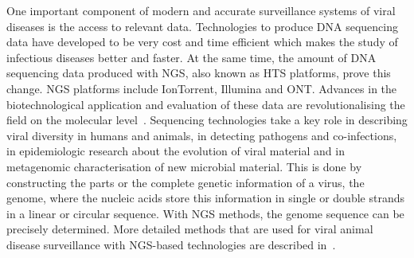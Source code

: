 One important component of modern and accurate surveillance systems of viral diseases is the access to relevant data. Technologies to produce \ac{DNA} sequencing data have developed to be very cost and time efficient which makes the study of infectious diseases better and faster. At the same time, the amount of \ac{DNA} sequencing data produced with \ac{NGS}, also known as \ac{HTS} platforms, prove this change. \ac{NGS} platforms include IonTorrent, Illumina and \ac{ONT}. Advances in the biotechnological application and evaluation of these data are revolutionalising the field on the molecular level~\cite{suminda2022high}. Sequencing technologies take a key role in describing viral diversity in humans and animals, in detecting pathogens and co-infections, in epidemiologic research about the evolution of viral material and in metagenomic characterisation of new microbial material. This is done by constructing the parts or the complete genetic information of a virus, the genome, where the nucleic acids store this information in single or double strands in a linear or circular sequence. With \ac{NGS} methods, the genome sequence can be precisely determined. More detailed methods that are used for viral animal disease surveillance with \ac{NGS}-based technologies are described in~.

